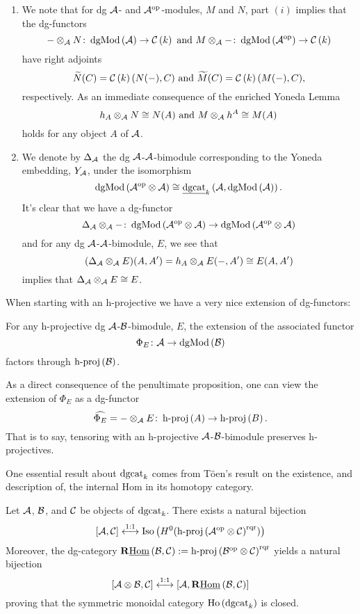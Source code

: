 \begin{remark}\label{rem: tensoring with reps}
  \begin{enumerate}
  \item
    We note that for dg \(\mathcal{A}\)- and \(\mathcal{A}^{\operatorname{op}}\)-modules, \(M\) and \(N\), part \((i)\) implies that the dg-functors
    \[- \otimes_{\mathcal{A}} N \colon \operatorname{dgMod}\left(\mathcal{A}\right) \to \mathcal{C}\left(k\right)\ \text{and}\ M \otimes_{\mathcal{A}} - \colon \operatorname{dgMod}\left(\mathcal{A}^{\operatorname{op}}\right) \to \mathcal{C}\left(k\right)\]
    have right adjoints
    \[\widetilde{N}(C) = \CH{k}(N( - ), C)\ \text{and}\ \widetilde{M}(C) = \CH{k}(M( - ), C),\]
    respectively.
    As an immediate consequence of the enriched Yoneda Lemma
    \[h_A \otimes_{\mathcal{A}} N \cong N(A)\ \text{and}\ M \otimes_{\mathcal{A}} h^A \cong M(A)\]
    holds for any object \(A\) of \(\mathcal{A}\).
  \item
    We denote by \(\Delta_{\mathcal{A}}\) the dg \(\mathcal{A}\)-\(\mathcal{A}\)-bimodule corresponding to the Yoneda embedding, \(Y_{\mathcal{A}}\), under the isomorphism
    \[\operatorname{dgMod}\left(\mathcal{A}^{\operatorname{op}} \otimes \mathcal{A}\right) \cong \underline{\operatorname{dgcat}}_{k}\left(\mathcal{A}, \operatorname{dgMod}\left(\mathcal{A}\right)\right).\]
    It's clear that we have a dg-functor
    \[\Delta_{\mathcal{A}} \otimes_{\mathcal{A}} - \colon \operatorname{dgMod}\left(\mathcal{A}^{\operatorname{op}} \otimes \mathcal{A}\right) \to \operatorname{dgMod}\left(\mathcal{A}^{\operatorname{op}} \otimes \mathcal{A}\right)\]
    and for any dg \(\mathcal{A}\)-\(\mathcal{A}\)-bimodule, \(E\), we see that
    \[(\Delta_{\mathcal{A}} \otimes_{\mathcal{A}} E)(A,A^\prime) = h_A \otimes_{\mathcal{A}} E(- , A^\prime) \cong E(A,A^\prime)\]
    implies that \(\Delta_{\mathcal{A}} \otimes_{\mathcal{A}} E \cong E\).
  \end{enumerate}
\end{remark}

When starting with an h-projective we have a very nice extension of dg-functors:
\begin{proposition}[{\textcite[Lemma 3.4]{CS15}}]
  For any h-projective dg \(\mathcal{A}\)-\(\mathcal{B}\)-bimodule, \(E\), the extension of the associated functor
  \[\Phi_E \colon \mathcal{A} \to \operatorname{dgMod}\left(\mathcal{B}\right)\]
  factors through \(\operatorname{h-proj}\left(\mathcal{B}\right)\).
\end{proposition}

As a direct consequence of the penultimate proposition, one can view the extension of \(\Phi_E\) as a dg-functor
\[\widehat{\Phi_E} = - \otimes_{\mathcal{A}} E \colon \operatorname{h-proj}\left(A\right) \to \operatorname{h-proj}\left(B\right).\]
That is to say, tensoring with an h-projective \(\mathcal{A}\)-\(\mathcal{B}\)-bimodule preserves h-projectives.

One essential result about \(\operatorname{dgcat}_k\) comes from T\"oen's result on the existence, and description of, the internal Hom in its homotopy category. 

\begin{theorem} \label{theorem: Toen}
  Let \(\mathcal{A}\), \(\mathcal{B}\), and \(\mathcal{C}\) be objects of \(\operatorname{dgcat}_k\).
  There exists a natural bijection
  \[[\mathcal{A},\mathcal{C}] \overset{1:1}\longleftrightarrow \operatorname{Iso}\left(H^0(\operatorname{h-proj}\left(\mathcal{A}^{{\operatorname{op}}} \otimes \mathcal{C}\right)^{\operatorname{rqr}})\right)\]
  Moreover, the dg-category \(\mathbf{R}\underline{\operatorname{Hom}}\left(\mathcal{B},\mathcal{C}\right) := \operatorname{h-proj}\left(\mathcal{B}^{\operatorname{op}} \otimes \mathcal{C}\right)^{\operatorname{rqr}}\) yields a natural bijection
  \[[\mathcal{A} \otimes \mathcal{B}, \mathcal{C}] \overset{1:1}\longleftrightarrow [\mathcal{A}, \mathbf{R}\underline{\operatorname{Hom}}\left(\mathcal{B},\mathcal{C}\right)]\]
  proving that the symmetric monoidal category \(\operatorname{Ho}\left(\operatorname{dgcat}_k\right)\) is closed.
\end{theorem}

